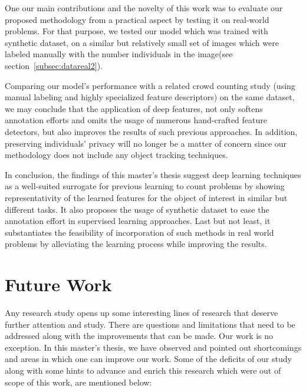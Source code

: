 \indent One our main contributions and the novelty of this work was to evaluate our proposed methodology from a practical aspect by testing it on real-world problems. For that purpose, we tested our model which was trained with synthetic dataset, on a similar but relatively small set of images which were labeled manually with the number individuals in the image(see section~\ref{subsec:datareal2}).    

Comparing our model's performance with a related crowd counting study (using manual labeling and highly specialized feature descriptors) on the same dataset, we may conclude that the application of deep features, not only softens annotation efforts and omits the usage of numerous hand-crafted feature detectors, but also improves the results of such previous approaches. In addition, preserving individuals' privacy will no longer be a matter of concern since our methodology does not include any object tracking techniques.    

\noindent In conclusion, the findings of this master's thesis suggest deep learning techniques as a well-suited surrogate for previous learning to count problems by showing representativity of the learned features for the object of interest in similar but different tasks. It also proposes the usage of synthetic dataset to ease the annotation effort in supervised learning approaches. Last but not least, it substantiates the feasibility of incorporation of such methods in real world problems by alleviating the learning process while improving the results.  

\section{Future Work}

Any research study opens up some interesting lines of research that deserve further attention and study. There are questions and limitations that need to be addressed along with the improvements that can be made. Our work is no exception. In this master's thesis, we have observed and pointed out shortcomings and areas in which one can improve our work. Some of the deficits of our study along with some hints to advance and enrich this research which were out of scope of this work, are mentioned below:

